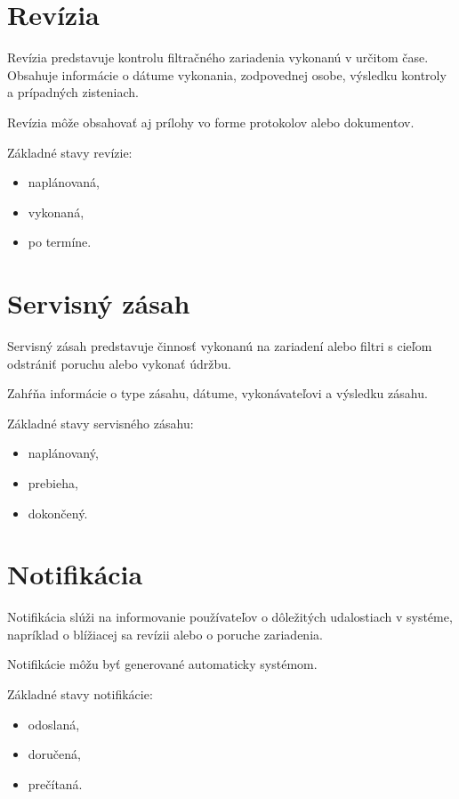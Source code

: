 \section{Revízia}

Revízia predstavuje kontrolu filtračného zariadenia vykonanú v určitom čase. Obsahuje informácie o dátume vykonania, zodpovednej osobe, výsledku kontroly a prípadných zisteniach.

Revízia môže obsahovať aj prílohy vo forme protokolov alebo dokumentov.

Základné stavy revízie:
\begin{itemize}
    \item naplánovaná,
    \item vykonaná,
    \item po termíne.
\end{itemize}

\section{Servisný zásah}

Servisný zásah predstavuje činnosť vykonanú na zariadení alebo filtri s cieľom odstrániť poruchu alebo vykonať údržbu.

Zahŕňa informácie o type zásahu, dátume, vykonávateľovi a výsledku zásahu.

Základné stavy servisného zásahu:
\begin{itemize}
    \item naplánovaný,
    \item prebieha,
    \item dokončený.
\end{itemize}

\section{Notifikácia}

Notifikácia slúži na informovanie používateľov o dôležitých udalostiach v systéme, napríklad o blížiacej sa revízii alebo o poruche zariadenia.

Notifikácie môžu byť generované automaticky systémom.

Základné stavy notifikácie:
\begin{itemize}
    \item odoslaná,
    \item doručená,
    \item prečítaná.
\end{itemize}

